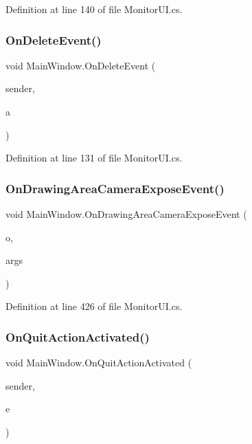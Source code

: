 Definition at line 140 of file Monitor\+U\+I.\+cs.

\mbox{\label{class_main_window_a64bdcb29cebb58957790da1ee2733fe1}} 
\subsubsection{On\+Delete\+Event()}
{\footnotesize\ttfamily void Main\+Window.\+On\+Delete\+Event (\begin{DoxyParamCaption}\item[{object}]{sender,  }\item[{Delete\+Event\+Args}]{a }\end{DoxyParamCaption})\hspace{0.3cm}{\ttfamily [protected]}}



Definition at line 131 of file Monitor\+U\+I.\+cs.

\mbox{\label{class_main_window_afe4b0001f191554aed5d9b65208a06f5}} 
\subsubsection{On\+Drawing\+Area\+Camera\+Expose\+Event()}
{\footnotesize\ttfamily void Main\+Window.\+On\+Drawing\+Area\+Camera\+Expose\+Event (\begin{DoxyParamCaption}\item[{object}]{o,  }\item[{Expose\+Event\+Args}]{args }\end{DoxyParamCaption})\hspace{0.3cm}{\ttfamily [protected]}}



Definition at line 426 of file Monitor\+U\+I.\+cs.

\mbox{\label{class_main_window_ab54b643c364b46a150f6f993267bb709}} 
\subsubsection{On\+Quit\+Action\+Activated()}
{\footnotesize\ttfamily void Main\+Window.\+On\+Quit\+Action\+Activated (\begin{DoxyParamCaption}\item[{object}]{sender,  }\item[{Event\+Args}]{e }\end{DoxyParamCaption})\hspace{0.3cm}{\ttfamily [protected]}}



